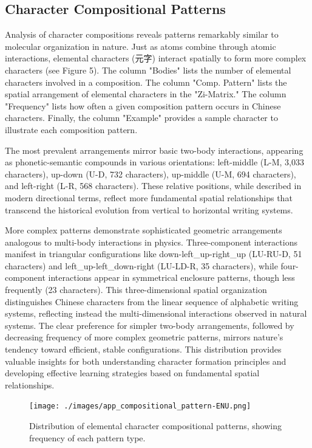 \documentclass[11pt,letterpaper]{article}
\begin{document}
\subsection{Character Compositional
Patterns}\label{character-compositional-patterns}

Analysis of character compositions reveals patterns remarkably similar to 
molecular organization in nature. Just as atoms combine through atomic interactions, 
elemental characters (元字) interact spatially to form more complex characters (see Figure 5). 
The column "Bodies" lists the number of elemental characters involved in a composition. 
The column "Comp. Pattern" lists the spatial arrangement of elemental characters 
in the "Zi-Matrix." The column "Frequency" lists how often a given composition pattern 
occurs in Chinese characters. Finally, the column "Example" provides a sample character 
to illustrate each composition pattern.


The most prevalent arrangements mirror
basic two-body interactions, appearing as phonetic-semantic compounds in
various orientations: left-middle (L-M, 3,033 characters), up-down (U-D,
732 characters), up-middle (U-M, 694 characters), and left-right (L-R,
568 characters). These relative positions, while described in modern
directional terms, reflect more fundamental spatial relationships that
transcend the historical evolution from vertical to horizontal writing
systems.



More complex patterns demonstrate sophisticated geometric arrangements
analogous to multi-body interactions in physics. Three-component
interactions manifest in triangular configurations like
down-left\_up-right\_up (LU-RU-D, 51 characters) and
left\_up-left\_down-right (LU-LD-R, 35 characters), while four-component
interactions appear in symmetrical enclosure patterns, though less
frequently (23 characters). This three-dimensional spatial organization
distinguishes Chinese characters from the linear sequence of alphabetic
writing systems, reflecting instead the multi-dimensional interactions
observed in natural systems. The clear preference for simpler two-body
arrangements, followed by decreasing frequency of more complex geometric
patterns, mirrors nature's tendency toward efficient, stable
configurations. This distribution provides valuable insights for both
understanding character formation principles and developing effective
learning strategies based on fundamental spatial relationships.

\begin{figure}
  \centering
  \texttt{[image: ./images/app\_compositional\_pattern-ENU.png]}
  \caption{Distribution of elemental character compositional patterns,
  showing frequency of each pattern type.}
\end{figure}
\end{document}
